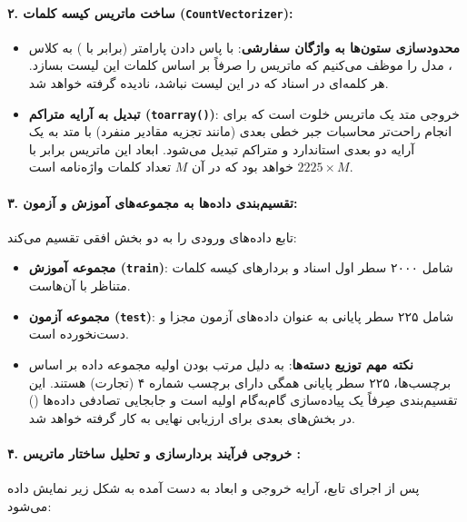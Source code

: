\documentclass{article}
\begin{document}
    \paragraph{۲. ساخت ماتریس کیسه کلمات (\texttt{CountVectorizer}):}
    \begin{itemize}
    \item \textbf{محدودسازی ستون‌ها به واژگان سفارشی}: با پاس دادن پارامتر  (برابر با ) به کلاس ، مدل را موظف می‌کنیم که ماتریس را صرفاً بر اساس کلمات این لیست بسازد. هر کلمه‌ای در اسناد که در این لیست نباشد، نادیده گرفته خواهد شد.
        
    \item \textbf{تبدیل به آرایه متراکم (\texttt{toarray()})}: خروجی متد   یک ماتریس خلوت است که برای انجام راحت‌تر محاسبات جبر خطی بعدی (مانند تجزیه مقادیر منفرد) با متد  به یک آرایه دو بعدی استاندارد و متراکم  تبدیل می‌شود. ابعاد این ماتریس برابر با $2225 \times M$ خواهد بود که در آن $M$ تعداد کلمات واژه‌نامه است.
\end{itemize}

    \paragraph{۳. تقسیم‌بندی داده‌ها به مجموعه‌های آموزش و آزمون:}\hspace{-10pt}
    تابع  داده‌های ورودی را به دو بخش افقی تقسیم می‌کند:
    \begin{itemize}
        \item \textbf{مجموعه آموزش (\texttt{train})}: شامل ۲۰۰۰ سطر اول اسناد و بردارهای کیسه کلمات متناظر با آن‌هاست.
        \item \textbf{مجموعه آزمون (\texttt{test})}: شامل ۲۲۵ سطر پایانی به عنوان داده‌های آزمون مجزا و دست‌نخورده است.
        \item \textbf{نکته مهم توزیع دسته‌ها}: به دلیل مرتب بودن اولیه مجموعه داده بر اساس برچسب‌ها، ۲۲۵ سطر پایانی همگی دارای برچسب شماره ۴ (تجارت) هستند. این تقسیم‌بندی صِرفاً یک پیاده‌سازی گام‌به‌گام اولیه است و جابجایی تصادفی داده‌ها () در بخش‌های بعدی برای ارزیابی نهایی به کار گرفته خواهد شد.
    \end{itemize}

\paragraph{۴. خروجی فرآیند بردارسازی و تحلیل ساختار ماتریس :}\hspace{-10pt}
    پس از اجرای تابع، آرایه خروجی و ابعاد به دست آمده به شکل زیر نمایش داده می‌شود:
\end{document}
